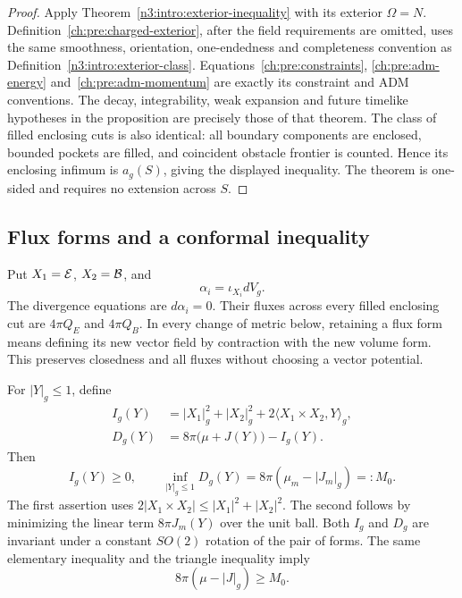 \begin{proof}
Apply Theorem~\ref{n3:intro:exterior-inequality} with its exterior
$\Omega=N$. Definition~\ref{ch:pre:charged-exterior}, after the field
requirements are omitted, uses the same smoothness, orientation,
one-endedness and completeness convention as
Definition~\ref{n3:intro:exterior-class}. Equations~\eqref{ch:pre:constraints},
\eqref{ch:pre:adm-energy} and~\eqref{ch:pre:adm-momentum} are exactly its
constraint and ADM conventions. The decay, integrability, weak expansion
and future timelike hypotheses in the proposition are precisely those
of that theorem. The class of filled enclosing cuts is also identical:
all boundary components are enclosed, bounded pockets are filled, and
coincident obstacle frontier is counted. Hence its enclosing infimum is
$a_g(S)$, giving the displayed inequality. The theorem is one-sided and
requires no extension across $S$.
\end{proof}

\subsection{Flux forms and a conformal inequality}

Put $X_1=\mathcal E$, $X_2=\mathcal B$, and
\begin{equation}\label{ch:pre:flux-forms}
 \alpha_i=\iota_{X_i}dV_g.
\end{equation}
The divergence equations are $d\alpha_i=0$. Their fluxes across every filled enclosing cut are $4\pi Q_E$ and $4\pi Q_B$. In every change of metric below, retaining a flux form means defining its new vector field by contraction with the new volume form. This preserves closedness and all fluxes without choosing a vector potential.

For $|Y|_g\le1$, define
\begin{align}
 I_g(Y)&=|X_1|_g^2+|X_2|_g^2
       +2\langle X_1\times X_2,Y\rangle_g,
 \label{ch:pre:I}\\
 D_g(Y)&=8\pi\bigl(\mu+J(Y)\bigr)-I_g(Y).
 \label{ch:pre:D}
\end{align}
Then
\begin{equation}\label{ch:pre:margin}
 I_g(Y)\ge0,\qquad
 \inf_{|Y|_g\le1}D_g(Y)
 =8\pi(\mu_m-|J_m|_g)=:M_0.
\end{equation}
The first assertion uses $2|X_1\times X_2|\le|X_1|^2+|X_2|^2$. The second follows by minimizing the linear term $8\pi J_m(Y)$ over the unit ball. Both $I_g$ and $D_g$ are invariant under a constant $SO(2)$ rotation of the pair of forms. The same elementary inequality and the triangle inequality imply
\begin{equation}\label{ch:pre:neutral-margin}
 8\pi(\mu-|J|_g)\ge M_0.
\end{equation}

